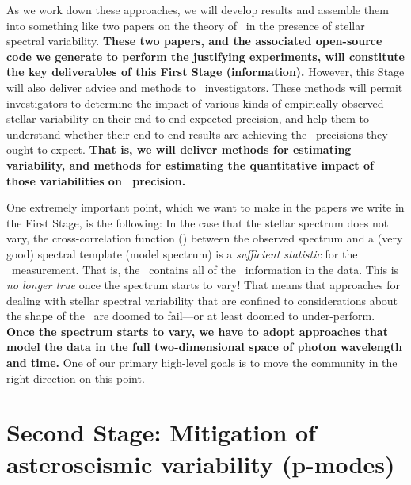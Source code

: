 \documentclass[12pt, letterpaper]{article}
\begin{document}
\noindent
As we work down these approaches, we will develop results and assemble them
into something like two papers on the theory of \EPRV\ in the presence of
stellar spectral variability. \textbf{These two papers, and the associated open-source
code we generate to perform the justifying experiments, will constitute the
key deliverables of this First Stage (information).}
However, this Stage will also deliver advice and methods to
\EPRV\ investigators.
These methods will permit investigators to determine the impact of
various kinds of empirically observed stellar variability on their
end-to-end expected precision,
and help them to understand whether their end-to-end results are
achieving the \RV\ precisions they ought to expect.
\textbf{That is, we will deliver methods for estimating variability, and methods
for estimating the quantitative impact of those variabilities on \RV\ precision.}

One extremely important point, which we want to make in the papers we write
in the First Stage, is the following:
In the case that the stellar spectrum does not vary, the
cross-correlation function (\CCF) between the observed spectrum and a
(very good) spectral template (model spectrum) is a \emph{sufficient
  statistic} for the \RV\ measurement.
That is, the \CCF\ contains all of the \RV\ information in the data.
This is \emph{no longer true} once the spectrum starts to vary!
That means that approaches for dealing with stellar spectral variability
that are confined to considerations about the shape of the \CCF\ are
doomed to fail---or at least doomed to under-perform.
\textbf{Once the spectrum starts to vary, we have to adopt approaches that model
the data in the full two-dimensional space of photon wavelength and time.}
One of our primary high-level goals is to move the community in the
right direction on this point.

\section{Second Stage: Mitigation of asteroseismic variability (p-modes)}
\end{document}
